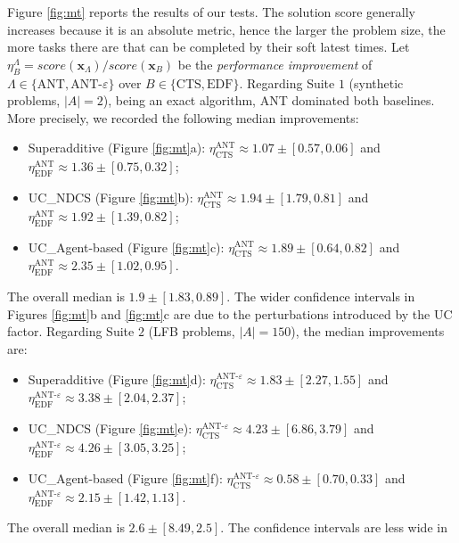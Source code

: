 Figure \ref{fig:mt} reports the results of our tests. The solution score generally
increases because it is an absolute metric, hence the larger the problem size, the more
tasks there are that can be completed by their soft latest times. Let $\eta^{\Lambda}_{B}
= score(\bm{x}_{\Lambda}) / score(\bm{x}_{B})$ be the \emph{performance improvement} of
$\Lambda \in \{ \text{ANT}, \text{ANT-}\varepsilon \}$ over $B \in \{ \text{CTS},
\text{EDF} \}$. Regarding Suite $1$ (synthetic problems, $|A| = 2$), being an exact
algorithm, ANT dominated both baselines. More precisely, we recorded the following median
improvements:
\begin{itemize}
    \item Superadditive (Figure \ref{fig:mt}a): $\eta^{\text{ANT}}_{\text{CTS}} \approx 1.07
        \pm [0.57, 0.06]$ and $\eta^{\text{ANT}}_{\text{EDF}} \approx 1.36 \pm [0.75, 0.32]$;
    \item UC\_NDCS (Figure \ref{fig:mt}b): $\eta^{\text{ANT}}_{\text{CTS}} \approx 1.94
        \pm [1.79, 0.81]$ and $\eta^{\text{ANT}}_{\text{EDF}} \approx 1.92 \pm [1.39, 0.82]$;
    \item UC\_Agent-based (Figure \ref{fig:mt}c): $\eta^{\text{ANT}}_{\text{CTS}} \approx 1.89
        \pm [0.64, 0.82]$ and $\eta^{\text{ANT}}_{\text{EDF}} \approx 2.35 \pm [1.02, 0.95]$.
\end{itemize}
The overall median is $1.9 \pm [1.83, 0.89]$. The wider confidence intervals in Figures
\ref{fig:mt}b and \ref{fig:mt}c are due to the perturbations introduced by the UC factor.
Regarding Suite $2$ (LFB problems, $|A| = 150$), the median improvements are:
\begin{itemize}
    \item Superadditive (Figure \ref{fig:mt}d):
        $\eta^{\text{ANT-}\varepsilon}_{\text{CTS}} \approx 1.83
        \pm [2.27, 1.55]$ and $\eta^{\text{ANT-}\varepsilon}_{\text{EDF}} \approx 3.38 \pm [2.04, 2.37]$;
    \item UC\_NDCS (Figure \ref{fig:mt}e): $\eta^{\text{ANT-}\varepsilon}_{\text{CTS}} \approx 4.23
        \pm [6.86, 3.79]$ and $\eta^{\text{ANT-}\varepsilon}_{\text{EDF}} \approx 4.26 \pm [3.05, 3.25]$;
    \item UC\_Agent-based (Figure \ref{fig:mt}f):
        $\eta^{\text{ANT-}\varepsilon}_{\text{CTS}} \approx 0.58
        \pm [0.70, 0.33]$ and $\eta^{\text{ANT-}\varepsilon}_{\text{EDF}} \approx 2.15 \pm [1.42, 1.13]$.
\end{itemize}
The overall median is $2.6 \pm [8.49, 2.5]$. The confidence intervals are less wide in
